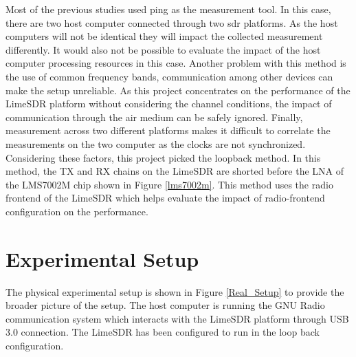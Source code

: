 Most of the previous studies used ping as the measurement tool.
In this case, there are two host computer connected through two \ac{sdr} platforms.
As the host computers will not be identical they will impact the collected measurement differently.
It would also not be possible to evaluate the impact of the host computer processing resources in this case.
Another problem with this method is the use of common frequency bands, communication among other devices can make the setup unreliable.
As this project concentrates on the performance of the LimeSDR platform without considering the channel conditions, the impact of communication through the air medium can be safely ignored.
Finally, measurement across two different platforms makes it difficult to correlate the measurements on the two computer as the clocks are not synchronized.
Considering these factors, this project picked the loopback method.
In this method, the TX and RX chains on the LimeSDR are shorted before the \ac{LNA} of the LMS7002M chip shown in Figure \ref{lms7002m}.
This method uses the radio frontend of the LimeSDR which helps evaluate the impact of radio-frontend configuration on the performance.




\section{Experimental Setup}
The physical experimental setup is shown in Figure \ref{Real_Setup} to provide the broader picture of the setup.
The host computer is running the GNU Radio communication system which interacts with the LimeSDR platform through \ac{USB} 3.0 connection.
The LimeSDR has been configured to run in the loop back configuration.\\

